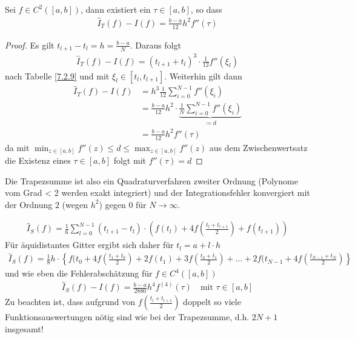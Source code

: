 \documentclass[ngerman,fontsize=11pt, paper=a4, parskip=half, titlepage=true, toc=bib]{scrbook}
\begin{document}
\begin{Leme}\label{7.2.11}
  Sei $f\in C^2([a,b])$, dann existiert ein $\tau \in[a,b]$, so dass
  \begin{gather}
    \hat{I}_T(f) -I(f) = \frac{b-a}{12}h^2 f''(\tau) %
    \label{VII.2.12}
  \end{gather}

  \begin{proof}
    Es gilt $t_{l+1}-t_l = h= \frac{b-a}{N}$.
    Daraus folgt
    \begin{gather*}
      \hat{I}_T(f)-I(f)=(t_{l+1}+t_l)^3\cdot\frac{1}{12}f''(\xi_l)
    \end{gather*}
    nach Tabelle \ref{7.2.9} und mit
    $\xi_l\in[t_l,t_{l+1}]$.
    Weiterhin gilt dann
    \begin{align*}
      \hat{I}_T(f) - I(f) &= h^3\frac{1}{12}\sum_{i=0}^{N-1}f''(\xi_i)\\
                          &= \frac{b-a}{12}h^2 \cdot \underbrace{
                            \frac{1}{N}\sum_{i=0}^{N-1}f''(\xi_i)
                            }_{\coloneqq d}\\
                          &= \frac{b-a}{12}h^2 f''(\tau)
    \end{align*}
    da mit $\min_{z\in[a,b]} f''(z) \leq d \leq \max_{z\in[a,b]}f''(z)$
    aus dem Zwischenwertsatz die Existenz eines $\tau\in[a,b]$ folgt
    mit $f''(\tau) = d$
  \end{proof}
\end{Leme}

Die Trapezsumme ist also ein
Quadraturverfahren zweiter Ordnung
(Polynome vom Grad < 2 werden exakt integriert) und der
Integrationsfehler konvergiert mit der Ordnung 2 (wegen $h^2$) gegen 0
für $N\longrightarrow \infty$.

\begin{gather}
  \hat{I}_S(f) = \frac{1}{6}\sum_{l=0}^{N-1} (t_{l+1}-t_l)
  \cdot \left(f(t_l) +4f(\frac{t_l+t_{l+1}}{2}) + f(t_{l+1})
  \right)
  \label{VII.2.13}
\end{gather}
Für äquidistantes Gitter ergibt sich daher für $t_l=a+l\cdot h$
\begin{gather}
  \hat{I}_S(f) = \frac{1}{8}h\cdot
  \left\{
    f(t_0+4f\left(\frac{t_1+t_0}{2}\right) 
    +2f(t_1) + 3f\left(\frac{t_2+t_1}{2}\right)
    + \ldots +2f(t_{N-1}
    +4f\left(\frac{t_{N-1}+t_N}{2}\right)
  \right\}
  \label{VII.2.14}
\end{gather}
und wie eben die Fehlerabschätzung
für $f\in C^4([a,b])$
\begin{gather}
  \hat{I}_S(f) -I(f) =
  \frac{b-a}{2880}h^4f^{(4)}(\tau)
  \quad \text{mit } \tau\in[a,b]
  \label{VII.2.15}
\end{gather}
Zu beachten ist, dass aufgrund von
$f\left(\frac{t_l+t_{l+1}}{2}\right)$
doppelt so viele Funktionsauswertungen nötig sind
wie bei der Trapezsumme, d.h. $2N+1$ insgesamt!
\end{document}
